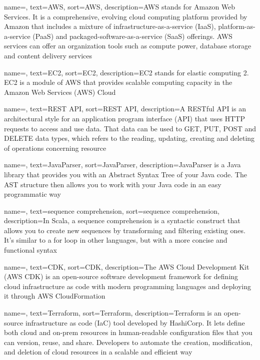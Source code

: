 {
    name=,
    text=AWS,
    sort=AWS,
    description={AWS stands for Amazon Web Services. It is a comprehensive, evolving cloud computing platform provided by Amazon that includes a mixture of infrastructure-as-a-service (IaaS), platform-as-a-service (PaaS) and packaged-software-as-a-service (SaaS) offerings. AWS services can offer an organization tools such as compute power, database storage and content delivery services}
}


{
    name=,
    text=EC2,
    sort=EC2,
    description={EC2 stands for elastic computing 2. EC2 is a module of AWS that provides scalable computing capacity in the Amazon Web Services (AWS) Cloud }
}

{
    name=,
    text=REST API,
    sort=REST API,
    description={A RESTful API is an architectural style for an application program interface (API) that uses HTTP requests to access and use data. That data can be used to GET, PUT, POST and DELETE data types, which refers to the reading, updating, creating and deleting of operations concerning resource}
}

{
    name=,
    text=JavaParser,
    sort=JavaParser,
    description={JavaParser is a Java library that provides you with an Abstract Syntax Tree of your Java code. The AST structure then allows you to work with your Java code in an easy programmatic way}
}

{
    name=,
    text=sequence comprehension,
    sort=sequence comprehension,
    description={In Scala, a sequence comprehension is a syntactic construct that allows you to create new sequences by transforming and filtering existing ones. It's similar to a for loop in other languages, but with a more concise and functional syntax }
}

{
    name=,
    text=CDK,
    sort=CDK,
    description={The AWS Cloud Development Kit (AWS CDK) is an open-source software development framework for defining cloud infrastructure as code with modern programming languages and deploying it through AWS CloudFormation}
}

{
    name=,
    text=Terraform,
    sort=Terraform,
    description={Terraform is an open-source infrastructure as code (IaC) tool developed by HashiCorp. It lets define both cloud and on-prem resources in human-readable configuration files that you can version, reuse, and share. Developers to automate the creation, modification, and deletion of cloud resources in a scalable and efficient way}
}

